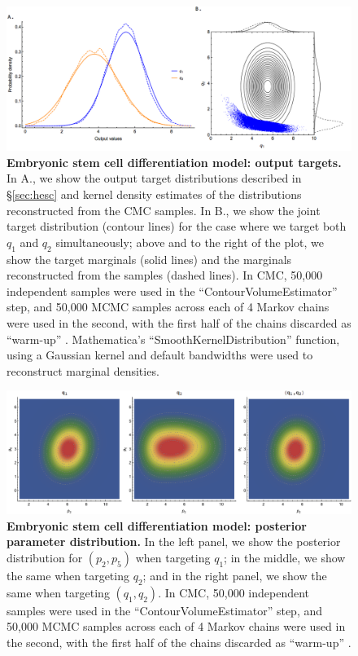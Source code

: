 \begin{figure}[H]
	\centerline{\includegraphics[width=1\textwidth]{../figures/tu_outputs.png}}
	\caption{\textbf{Embryonic stem cell differentiation model: output targets.} In A., we show the output target distributions described in \S\ref{sec:hesc} and kernel density estimates of the distributions reconstructed from the CMC samples. In B., we show the joint target distribution (contour lines) for the case where we target both $q_1$ and $q_2$ simultaneously; above and to the right of the plot, we show the target marginals (solid lines) and the marginals reconstructed from the samples (dashed lines). In CMC, 50,000 independent samples were used in the ``ContourVolumeEstimator'' step, and 50,000 MCMC samples across each of 4 Markov chains were used in the second, with the first half of the chains discarded as ``warm-up'' \cite{lambert2018Student}. Mathematica's ``SmoothKernelDistribution'' function, using a Gaussian kernel \cite{mathematica} and default bandwidths were used to reconstruct marginal densities.}
	\label{fig:tu_outputs}
\end{figure}

\begin{figure}[H]
	\centerline{\includegraphics[width=1\textwidth]{../figures/tu_inputs.png}}
	\caption{\textbf{Embryonic stem cell differentiation model: posterior parameter distribution.} In the left panel, we show the posterior distribution for $(p_2, p_5)$ when targeting $q_1$; in the middle, we show the same when targeting $q_2$; and in the right panel, we show the same when targeting $(q_1, q_2)$. In CMC, 50,000 independent samples were used in the ``ContourVolumeEstimator'' step, and 50,000 MCMC samples across each of 4 Markov chains were used in the second, with the first half of the chains discarded as ``warm-up'' \cite{lambert2018Student}.}
	\label{fig:tu_inputs}
\end{figure}

